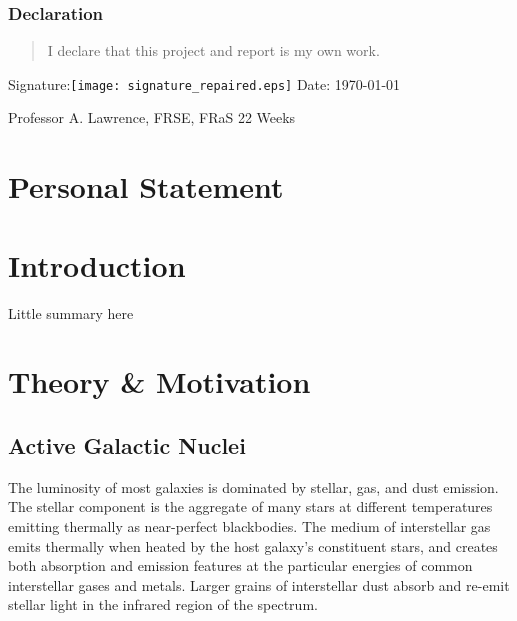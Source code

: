 \documentclass[a4paper,11pt]{article}
\begin{document}
\vspace*{1cm}

\subsubsection*{Declaration}
\begin{quotation}
  \noindent I declare that this project and report is my own work.
\end{quotation}

\hspace*{1cm}
Signature:\hspace*{1cm}\texttt{[image: signature\_repaired.eps]}
\hspace*{1cm}
Date: \today

\vfill
{} Professor A. Lawrence, FRSE, FRaS
\hfill
22 Weeks

\newpage
\thispagestyle{empty}
\section*{Personal Statement}\label{sec:personal_statement}
\lipsum[1]

\newpage
\thispagestyle{empty}
\tableofcontents

\newpage
\setcounter{page}{1} %
\section{Introduction}\label{sec:introduction}

Little summary here

\section{Theory \& Motivation}\label{sec:theory_and_motivation}
\subsection{Active Galactic Nuclei}\label{sec:active_galactic_nuclei}
The luminosity of most galaxies is dominated by stellar, gas, and dust emission. The stellar component is the aggregate of many stars at different temperatures emitting thermally as near-perfect blackbodies.\cite{Peterson_1997} The medium of interstellar gas emits thermally when heated by the host galaxy's constituent stars, and creates both absorption and emission features at the particular energies of common interstellar gases and metals. Larger grains of interstellar dust absorb and re-emit stellar light in the infrared region of the spectrum.\cite{Dyson_1997}
\end{document}
